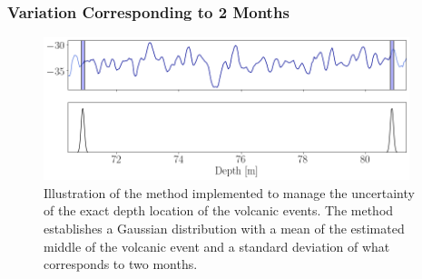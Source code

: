 \documentclass[../../CompleteThesis2/Complete_2ndDraft]{subfiles}
\begin{document}
\subsubsection[2 Month Variability]{Variation Corresponding to 2 Months}
\label{Subsubsec:Method_TestStab_LTlocations_2Month}

\begin{figure}[h]
	\centering
	\includegraphics[width=0.95\textwidth]{SiteA_LandT_Gauss_2Mnth.png}
	\caption[Illustration of 2 Month Standard Deviation Variation of Volcanic Events Locations]{\small Illustration of the method implemented to manage the uncertainty of the exact depth location of the volcanic events. The method establishes a Gaussian distribution with a mean of the estimated middle of the volcanic event and a standard deviation of what corresponds to two months.}
	\label{fig:SiteA_LandT_Gauss_2Mnth}
\end{figure}

\end{document}
